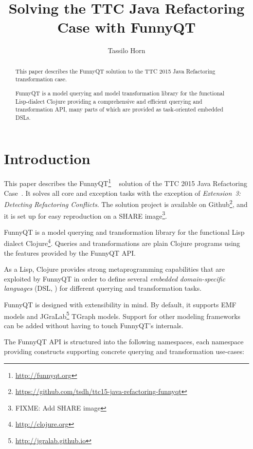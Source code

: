 \documentclass[submission]{eptcs}
\title{Solving the TTC Java Refactoring Case with FunnyQT}
\author{Tassilo Horn
  \institute{Institute for Software Technology, University Koblenz-Landau, Germany}
  \email{horn@uni-koblenz.de}}
\begin{document}
\maketitle

\begin{abstract}
  This paper describes the FunnyQT solution to the TTC 2015 Java Refactoring
  transformation case.  %

  FunnyQT is a model querying and model transformation library for the
  functional Lisp-dialect Clojure providing a comprehensive and efficient
  querying and transformation API, many parts of which are provided as
  task-oriented embedded DSLs.
\end{abstract}


\section{Introduction}
\label{sec:introduction}

This paper describes the FunnyQT\footnote{\url{http://funnyqt.org}}
~\cite{Horn2013MQWFQ,funnyqt-icgt15} solution of the TTC 2015 Java Refactoring
Case~\cite{java-refactoring-case-desc}.  It solves all core and exception tasks
with the exception of \emph{Extension~3: Detecting Refactoring Conflicts}.  The
solution project is available on
Github\footnote{\url{https://github.com/tsdh/ttc15-java-refactoring-funnyqt}},
and it is set up for easy reproduction on a SHARE image\footnote{FIXME: Add
  SHARE image}.

FunnyQT is a model querying and transformation library for the functional Lisp
dialect Clojure\footnote{\url{http://clojure.org}}.  Queries and
transformations are plain Clojure programs using the features provided by the
FunnyQT API.

As a Lisp, Clojure provides strong metaprogramming capabilities that are
exploited by FunnyQT in order to define several \emph{embedded domain-specific
  languages} (DSL, \cite{book:Fowler2010DSL}) for different querying and
transformation tasks.

FunnyQT is designed with extensibility in mind.  By default, it supports EMF
\cite{Steinberg2008EEM} models and
JGraLab\footnote{\url{http://jgralab.github.io}} TGraph models.  Support for
other modeling frameworks can be added without having to touch FunnyQT's
internals.

The FunnyQT API is structured into the following namespaces, each namespace
providing constructs supporting concrete querying and transformation use-cases:
\end{document}
